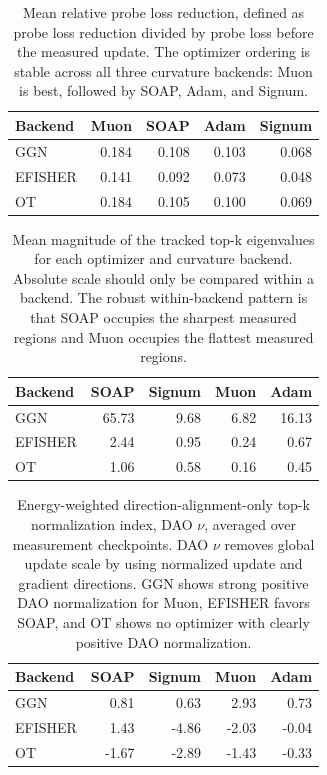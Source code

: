 \documentclass[11pt]{article}
\begin{document}
\begin{table}[htbp]
\centering
\small
\begin{tabular}{lrrrr}
\toprule
Backend & Muon & SOAP & Adam & Signum \\
\midrule
GGN & 0.184 & 0.108 & 0.103 & 0.068 \\
EFISHER & 0.141 & 0.092 & 0.073 & 0.048 \\
OT & 0.184 & 0.105 & 0.100 & 0.069 \\
\bottomrule
\end{tabular}
\caption{Mean relative probe loss reduction, defined as probe loss reduction divided by probe loss before the measured update. The optimizer ordering is stable across all three curvature backends: Muon is best, followed by SOAP, Adam, and Signum.}
\label{tab:cross-loss-ranking}
\end{table}

\begin{table}[htbp]
\centering
\small
\begin{tabular}{lrrrr}
\toprule
Backend & SOAP & Signum & Muon & Adam \\
\midrule
GGN & 65.73 & 9.68 & 6.82 & 16.13 \\
EFISHER & 2.44 & 0.95 & 0.24 & 0.67 \\
OT & 1.06 & 0.58 & 0.16 & 0.45 \\
\bottomrule
\end{tabular}
\caption{Mean magnitude of the tracked top-k eigenvalues for each optimizer and curvature backend. Absolute scale should only be compared within a backend. The robust within-backend pattern is that SOAP occupies the sharpest measured regions and Muon occupies the flattest measured regions.}
\label{tab:cross-top-eigs}
\end{table}

\begin{table}[htbp]
\centering
\small
\begin{tabular}{lrrrr}
\toprule
Backend & SOAP & Signum & Muon & Adam \\
\midrule
GGN & 0.81 & 0.63 & 2.93 & 0.73 \\
EFISHER & 1.43 & -4.86 & -2.03 & -0.04 \\
OT & -1.67 & -2.89 & -1.43 & -0.33 \\
\bottomrule
\end{tabular}
\caption{Energy-weighted direction-alignment-only top-k normalization index, DAO $\nu$, averaged over measurement checkpoints. DAO $\nu$ removes global update scale by using normalized update and gradient directions. GGN shows strong positive DAO normalization for Muon, EFISHER favors SOAP, and OT shows no optimizer with clearly positive DAO normalization.}
\label{tab:cross-dao-nu}
\end{table}
\end{document}
